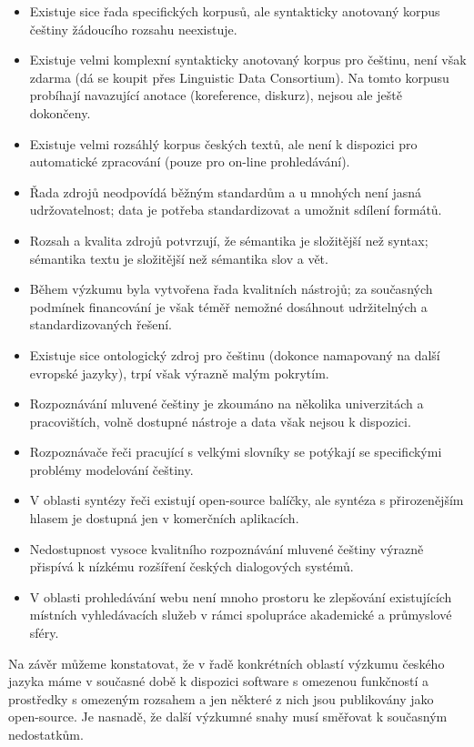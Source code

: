 \begin{multicols}{2}
\begin{itemize}
\item Existuje sice řada specifických korpusů, ale syntakticky anotovaný korpus češtiny žádoucího rozsahu neexistuje.
\item Existuje velmi komplexní syntakticky anotovaný korpus pro češtinu, není však zdarma (dá se koupit přes Linguistic Data Consortium). Na tomto korpusu probíhají navazující anotace (koreference, diskurz), nejsou ale ještě dokončeny.
\item Existuje velmi rozsáhlý korpus českých textů, ale není k dispozici pro automatické zpracování (pouze pro on-line prohledávání).
\item Řada zdrojů neodpovídá běžným standardům a u mnohých není jasná udržovatelnost; data je potřeba standardizovat a umožnit sdílení formátů.
\item Rozsah a kvalita zdrojů potvrzují, že sémantika je složitější než syntax; sémantika textu je složitější než sémantika slov a vět.
\item Během výzkumu byla vytvořena řada kvalitních nástrojů; za současných podmínek financování je však téměř nemožné dosáhnout udržitelných a standardizovaných řešení.
\item Existuje sice ontologický zdroj pro češtinu (dokonce namapovaný na další evropské jazyky), trpí však výrazně malým pokrytím.
\item Rozpoznávání mluvené češtiny je zkoumáno na několika univerzitách a pracovištích, volně dostupné nástroje a data však nejsou k dispozici.
\item Rozpoznávače řeči pracující s velkými slovníky se potýkají se specifickými problémy modelování češtiny.
\item V oblasti syntézy řeči existují open-source balíčky, ale syntéza s přirozenějším hlasem je dostupná jen v komerčních aplikacích.
\item Nedostupnost vysoce kvalitního rozpoznávání mluvené češtiny výrazně přispívá k nízkému rozšíření českých dialogových systémů.
\item V oblasti prohledávání webu není mnoho prostoru ke zlepšování existujících místních vyhledávacích služeb v rámci spolupráce akademické a průmyslové sféry.
\end{itemize}

Na závěr můžeme konstatovat, že v řadě konkrétních oblastí výzkumu českého jazyka máme v současné době k dispozici software s omezenou funkčností a prostředky s omezeným rozsahem a jen některé z nich jsou publikovány jako open-source. Je nasnadě, že další výzkumné snahy musí směřovat k současným nedostatkům.


\end{multicols}
